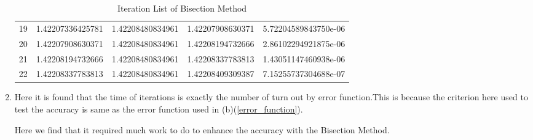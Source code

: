 \begin{solution}
\begin{enumerate}[label=(\alph*)]
\begin{table}[htb]
\begin{tabular}{@{}lllll@{}}
19 & 1.42207336425781  & 1.42208480834961 & 1.42207908630371  & 5.72204589843750e-06 \\
20 & 1.42207908630371  & 1.42208480834961 & 1.42208194732666  & 2.86102294921875e-06 \\
21 & 1.42208194732666  & 1.42208480834961 & 1.42208337783813  & 1.43051147460938e-06 \\
22 & 1.42208337783813  & 1.42208480834961 & 1.42208409309387  & 7.15255737304688e-07 \\ \bottomrule
\end{tabular}
\caption{Iteration List of Bisection Method} \label{result_sheet}
\end{table}

\item
Here it is found that the time of iterations is exactly the number of turn out by error function.This is because the criterion here used to test the accuracy is same as the error function used in (b)(\ref{error_function}). 


Here we find that it required much work to do to enhance the accuracy with the Bisection Method.




\end{enumerate}










\end{solution}


